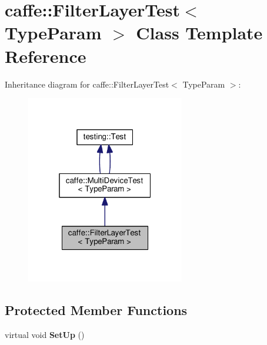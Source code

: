 \hypertarget{classcaffe_1_1_filter_layer_test}{}\section{caffe\+:\+:Filter\+Layer\+Test$<$ Type\+Param $>$ Class Template Reference}
\label{classcaffe_1_1_filter_layer_test}


Inheritance diagram for caffe\+:\+:Filter\+Layer\+Test$<$ Type\+Param $>$\+:
\nopagebreak
\begin{figure}[H]
\begin{center}
\leavevmode
\includegraphics[width=196pt]{classcaffe_1_1_filter_layer_test__inherit__graph}
\end{center}
\end{figure}
\subsection*{Protected Member Functions}
\begin{DoxyCompactItemize}
\item 
\mbox{\label{classcaffe_1_1_filter_layer_test_a1ac56093ce7149e1111954eecf94eb9f}} 
virtual void {\bfseries Set\+Up} ()
\end{DoxyCompactItemize}
